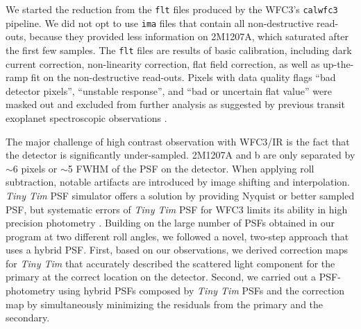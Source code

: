 \documentclass[apj]{emulateapj}
\newcommand{\ima}{\texttt{ima} files }
\newcommand{\flt}{\texttt{flt} files }
\newcommand{\tinytim}{\textit{Tiny Tim}}
\begin{document}
We started the reduction from the \flt{} produced by the WFC3's
\texttt{calwfc3} pipeline. We did not opt to use \ima{} that contain
all non-destructive read-outs, because they provided less information
on 2M1207A, which saturated after the first few samples.  The \flt{}
are results of basic calibration, including dark current correction,
non-linearity correction, flat field correction, as well as
up-the-ramp fit on the non-destructive read-outs. 
Pixels with data quality flags ``bad detector pixels'', ``unstable
response'', and ``bad or uncertain flat value'' were masked out and
excluded from further analysis as suggested by previous transit
exoplanet spectroscopic observations \citep[e.g.][]{Berta2012,
  Kreidberg2014}.


The major challenge of high contrast observation with WFC3/IR is the
fact that the detector is significantly under-sampled.  2M1207A and b
are only separated by $\sim6$ pixels or $\sim$5 FWHM of the PSF on the
detector. When applying roll subtraction, notable artifacts are
introduced by image shifting and interpolation.  \tinytim{} PSF
simulator \citep{Krist1995} offers a solution by providing Nyquist or
better sampled PSF, but systematic errors of \tinytim{} PSF for WFC3
limits its ability in high precision photometry \citep{Biretta2014}.
Building on the large number of PSFs obtained in our program at two
different roll angles, we followed a novel, two-step approach that
uses a hybrid PSF.  First, based on our observations, we derived
correction maps for \tinytim{} that accurately described the scattered
light component for the primary at the correct location on the
detector. Second, we carried out a PSF-photometry using hybrid PSFs
composed by \tinytim{} PSFs and the correction map by simultaneously
minimizing the residuals from the primary and the secondary.
\end{document}

